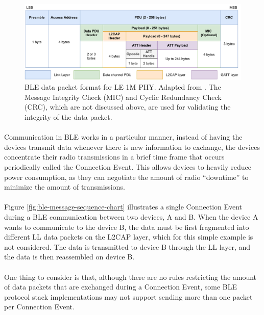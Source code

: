 \begin{figure}[H]
    \centering
    \includegraphics[width=\linewidth]{images/bluetooth data packet format.pdf}
    \caption[Diagram of the \acs{BLE} data packet format for LE 1M \acs{PHY}.]{\acs{BLE} data packet format for LE 1M \acs{PHY}. Adapted from \cite{Specification1999, Farej2020}. The Message Integrity Check (MIC) and Cyclic Redundancy Check (CRC), which are not discussed above, are used for validating the integrity of the data packet.}
    \label{fig:ble-ll-packet-format}
\end{figure}

\paragraph{} Communication in \acs{BLE} works in a particular manner, instead of having the devices transmit data whenever there is new information to exchange, the devices concentrate their radio transmissions in a brief time frame that occurs periodically called the Connection Event. This allows devices to heavily reduce power consumption, as they can negotiate the amount of radio ``downtime'' to minimize the amount of transmissions.

\paragraph{}  Figure \ref{fig:ble-message-sequence-chart} illustrates a single Connection Event during a \acs{BLE} communication between two devices, A and B. When the device A wants to communicate to the device B, the data must be first fragmented into different \acs{LL} data packets on the \acs{L2CAP} layer, which for this simple example is not considered. The data is transmitted to device B through the \acs{LL} layer, and the data is then reassembled on device B. 

\paragraph{} One thing to consider is that, although there are no rules restricting the amount of data packets that are exchanged during a Connection Event, some \acs{BLE} protocol stack implementations may not support sending more than one packet per Connection Event.


